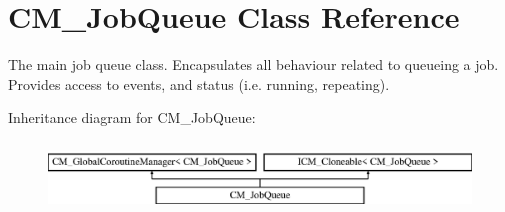 \hypertarget{class_c_m___job_queue}{}\section{C\+M\+\_\+\+Job\+Queue Class Reference}
\label{class_c_m___job_queue}


The main job queue class. Encapsulates all behaviour related to queueing a job. Provides access to events, and status (i.\+e. running, repeating).  


Inheritance diagram for C\+M\+\_\+\+Job\+Queue\+:\begin{figure}[H]
\begin{center}
\leavevmode
\includegraphics[height=1.872910cm]{class_c_m___job_queue}
\end{center}
\end{figure}
